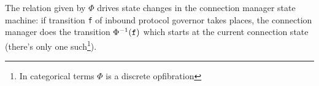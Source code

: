 \documentclass{article}
\begin{document}
\noindent The relation given by \(\Phi\) drives state changes in the connection manager
state machine: if transition \texttt{f} of inbound protocol governor takes
places, the connection manager does the transition
\(\Phi^{-1}(\text{\texttt{f}})\) which starts at the current connection state
(there's only one such\footnote{In categorical terms \(\Phi\) is a discrete
opfibration}).




\end{document}
